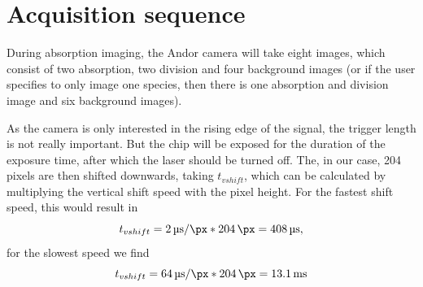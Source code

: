 \appendix
\chapter{Acquisition sequence}
\label{ch:acqseq}
During absorption imaging, the Andor camera will take eight images, which consist of two absorption, two division and four background images (or if the user specifies to only image one species, then there is one absorption and division image and six background images).

As the camera is only interested in the rising edge of the signal, the trigger length is not really important. But the chip will be exposed for the duration of the exposure time, after which the laser should be turned off. The, in our case, 204 pixels are then shifted downwards, taking $t_{vshift}$, which can be calculated by multiplying the vertical shift speed with the pixel height. For the fastest shift speed, this would result in
\begin{equation}
t_{vshift} = \SI{2}{\micro\second\per\px} * \SI{204}{\px} = \SI{408}{\micro\second},
\end{equation}
for the slowest speed we find
\begin{equation}
t_{vshift} = \SI{64}{\micro\second\per\px} * \SI{204}{\px} = \SI{13.1}{\milli\second}
\end{equation}


